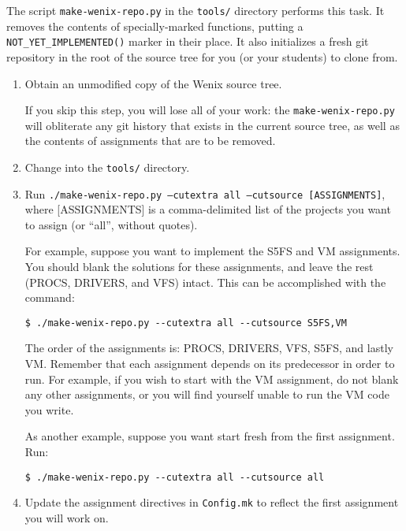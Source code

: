 The script \texttt{make-wenix-repo.py} in the \texttt{tools/} directory performs this task.  It removes the contents of specially-marked functions, putting a \texttt{NOT\_YET\_IMPLEMENTED()} marker in their place.  It also initializes a fresh git repository in the root of the source tree for you (or your students) to clone from.

\begin{enumerate}

\item Obtain an unmodified copy of the Wenix source tree.

If you skip this step, you will lose all of your work: the \texttt{make-wenix-repo.py} will obliterate any git history that exists in the current source tree, as well as the contents of assignments that are to be removed.

\item Change into the \texttt{tools/} directory.

\item Run \texttt{./make-wenix-repo.py --cutextra all --cutsource [ASSIGNMENTS]}, where [ASSIGNMENTS] is a comma-delimited list of the projects you want to assign (or ``all'', without quotes).

For example, suppose you want to implement the S5FS and VM assignments.  You should blank the solutions for these assignments, and leave the rest (PROCS, DRIVERS, and VFS) intact.  This can be accomplished with the command:

\begin{verbatim}
$ ./make-wenix-repo.py --cutextra all --cutsource S5FS,VM\end{verbatim}

The order of the assignments is: PROCS, DRIVERS, VFS, S5FS, and lastly VM.  Remember that each assignment depends on its predecessor in order to run.  For example, if you wish to start with the VM assignment, do not blank any other assignments, or you will find yourself unable to run the VM code you write.

As another example, suppose you want start fresh from the first assignment.  Run:

\begin{verbatim}
$ ./make-wenix-repo.py --cutextra all --cutsource all\end{verbatim}

\item Update the assignment directives in \texttt{Config.mk} to reflect the first assignment you will work on.


\end{enumerate}
